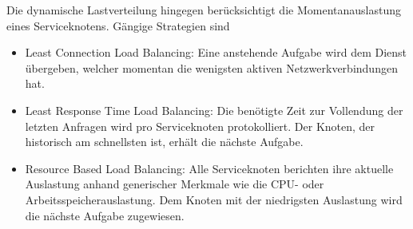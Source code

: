 Die dynamische Lastverteilung hingegen berücksichtigt die Momentanauslastung eines Serviceknotens.
Gängige Strategien sind
\begin{itemize}
	\item Least Connection Load Balancing:
    Eine anstehende Aufgabe wird dem Dienst übergeben, welcher momentan die wenigsten aktiven Netzwerkverbindungen hat.
	\item Least Response Time Load Balancing:
    Die benötigte Zeit zur Vollendung der letzten Anfragen wird pro Serviceknoten protokolliert.
    Der Knoten, der historisch am schnellsten ist, erhält die nächste Aufgabe.
	\item Resource Based Load Balancing:
    Alle Serviceknoten berichten ihre aktuelle Auslastung anhand generischer Merkmale wie die CPU- oder Arbeitsspeicherauslastung.
    Dem Knoten mit der niedrigsten Auslastung wird die nächste Aufgabe zugewiesen.
\end{itemize}















